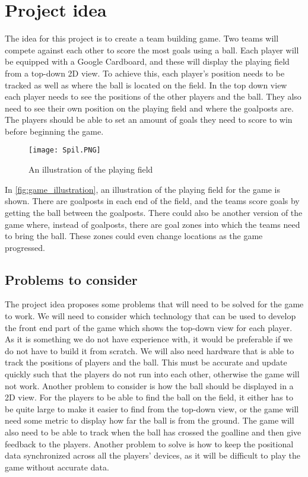 \section{Project idea}
The idea for this project is to create a team building game.
Two teams will compete against each other to score the most goals using a ball. 
Each player will be equipped with a Google Cardboard, and these will display the playing field from a top-down 2D view. 
To achieve this, each player's position needs to be tracked as well as where the ball is located on the field.
In the top down view each player needs to see the positions of the other players and the ball.
They also need to see their own position on the playing field and where the goalposts are.
The players should be able to set an amount of goals they need to score to win before beginning the game. 
\begin{figure}[H]
    \centering
    \texttt{[image: Spil.PNG]}
    \caption{An illustration of the playing field}
    \label{fig:game_illustration}
\end{figure}
In \autoref{fig:game_illustration}, an illustration of the playing field for the game is shown.
There are goalposts in each end of the field, and the teams score goals by getting the ball between the goalposts.
There could also be another version of the game where, instead of goalposts, there are goal zones into which the teams need to bring the ball.
These zones could even change locations as the game progressed.
\subsection{Problems to consider}
The project idea proposes some problems that will need to be solved for the game to work.
We will need to consider which technology that can be used to develop the front end part of the game which shows the top-down view for each player. 
As it is something we do not have experience with, it would be preferable if we do not have to build it from scratch.
We will also need hardware that is able to track the positions of players and the ball.
This must be accurate and update quickly such that the players do not run into each other, otherwise the game will not work.
Another problem to consider is how the ball should be displayed in a 2D view.
For the players to be able to find the ball on the field, it either has to be quite large to make it easier to find from the top-down view, or the game will need some metric to display how far the ball is from the ground.
The game will also need to be able to track when the ball has crossed the goalline and then give feedback to the players.
Another problem to solve is how to keep the positional data synchronized across all the players' devices, as it will be difficult to play the game without accurate data.
